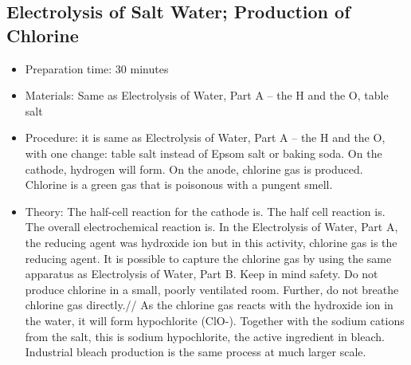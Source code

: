 \subsection{Electrolysis of Salt Water; Production of Chlorine}
\begin{itemize}
\item{Preparation time: 30 minutes}
\item{Materials: Same as Electrolysis of Water, Part A – the H and the O, table salt  }
\item{Procedure:  it is same as Electrolysis of Water, Part A – the H and the O, with one change: table salt instead of Epsom salt or baking soda. On the cathode, hydrogen will form. On the anode, chlorine gas is produced. Chlorine is a green gas that is poisonous with a pungent smell.}
\item{Theory: The half-cell reaction for the cathode is. The half cell reaction is. The overall electrochemical reaction is. In the Electrolysis of Water, Part A, the reducing agent was hydroxide ion but in this activity, chlorine gas is the reducing agent. It is possible to capture the chlorine gas by using the same apparatus as Electrolysis of Water, Part B. Keep in mind safety. Do not produce chlorine in a small, poorly ventilated room. Further, do not breathe chlorine gas directly.//
As the chlorine gas reacts with the hydroxide ion in the water, it will form hypochlorite (ClO-). Together with the sodium cations from the salt, this is sodium hypochlorite, the active ingredient in bleach. Industrial bleach production is the same process at much larger scale.}
\end{itemize}

